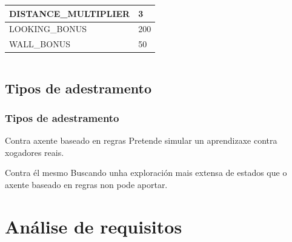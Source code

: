 \documentclass{beamer}
\begin{document}
\begin{frame}
\begin{columns}
\begin{column}{5cm}
{\begin{minipage}{1.6\linewidth}
\begin{table}
\begin{center}
\begin{tabular}{|l|l|}
			\hline
			DISTANCE\_MULTIPLIER& 3\\
			
			\hline
			LOOKING\_BONUS& 200\\
			
			\hline
			WALL\_BONUS& 50\\
			
			\hline
		\end{tabular}
		\label{algoritmo:valores}
	\end{center}
\end{table}
\end{minipage}	
}
	\end{column}

\end{columns}



\end{frame}


\subsection{Tipos de adestramento}
\begin{frame}
\frametitle{Tipos de adestramento} 

\begin{block}{Contra axente baseado en regras} %
	Pretende simular un aprendizaxe contra xogadores reais.
\end{block}

\begin{block}{Contra él mesmo}
	Buscando unha exploración mais extensa de estados que o axente baseado en regras non pode aportar.
\end{block}

\end{frame}



\section{Análise de requisitos}
\end{document}
